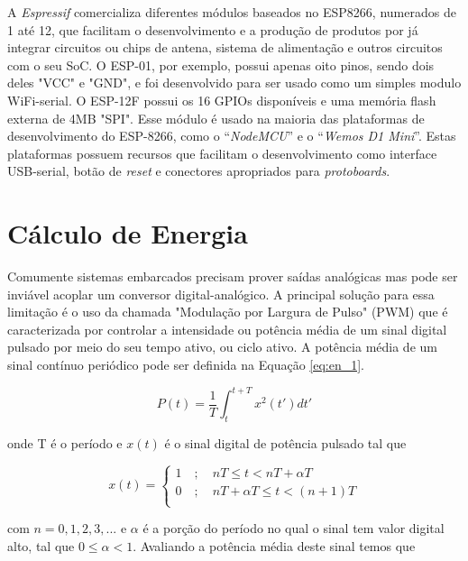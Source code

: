 A \textit{Espressif} comercializa diferentes módulos baseados no ESP8266, numerados de 1 até 12, que facilitam o desenvolvimento e a produção de produtos por já integrar circuitos ou chips de antena, sistema de alimentação e outros circuitos com o seu SoC. O ESP-01, por exemplo, possui apenas oito pinos, sendo dois deles "VCC" e "GND", e foi desenvolvido para ser usado como um simples modulo WiFi-serial. O ESP-12F possui os 16 GPIOs disponíveis e uma memória flash externa de 4MB "SPI". Esse módulo é usado na maioria das plataformas de desenvolvimento do ESP-8266, como o “\textit{NodeMCU}” e o “\textit{Wemos D1 Mini}”. Estas plataformas possuem recursos que facilitam o desenvolvimento como interface USB-serial, botão de \textit{reset} e conectores apropriados para \textit{protoboards}.

\section{Cálculo de Energia}

Comumente sistemas embarcados precisam prover saídas analógicas mas pode ser inviável acoplar um conversor digital-analógico. A principal solução para essa limitação é o uso da chamada "Modulação por Largura de Pulso" (PWM) que é caracterizada por controlar a intensidade ou potência média de um sinal digital pulsado por meio do seu tempo ativo, ou ciclo ativo. A potência média de um sinal contínuo periódico pode ser definida na Equação \eqref{eq:en_1}.

\begin{equation}
\label{eq:en_1}
P(t) = \frac{1}{T} \int_{t}^{t+T}x^2(t')dt'
\end{equation}

\noindent onde T é o período e $x(t)$ é o sinal digital de potência pulsado tal que

\begin{equation}
    \label{eq:en_2}
    x(t) =  \left\{
            \begin{array}{ll}
                1 \quad ; \quad nT \leq t < nT+\alpha T \\
                0 \quad ; \quad nT+\alpha T \leq t < (n+1)T\\
            \end{array}
            \right.
\end{equation}

\noindent com $n = 0, 1, 2, 3, ...$ e $\alpha$ é a porção do período no qual o sinal tem valor digital alto, tal que $0 \leq \alpha < 1$. Avaliando a potência média deste sinal temos que 

